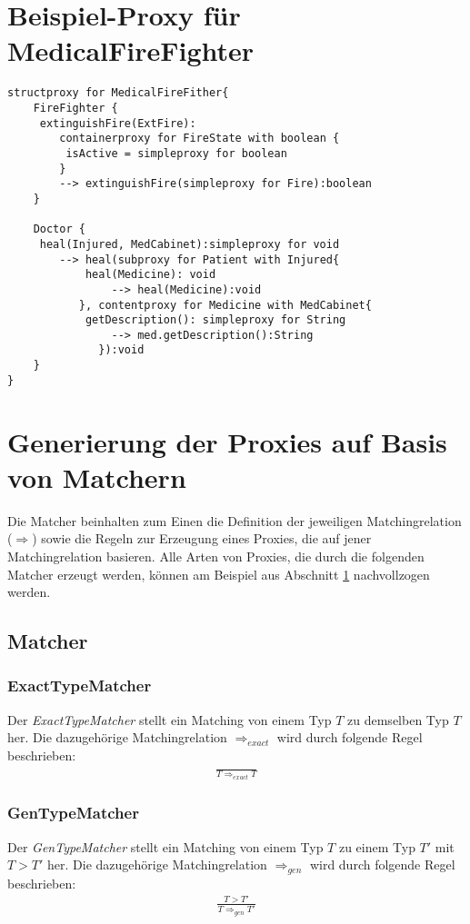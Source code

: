 \documentclass[a4paper,12pt]{article}
\begin{document}
\newpage
\section{Beispiel-Proxy für MedicalFireFighter}\label{xmpl_prxy}
\begin{lstlisting}[caption={Proxy für MedicalFireFighter},captionpos=b,style = dsl]
structproxy for MedicalFireFither{
	FireFighter {
	 extinguishFire(ExtFire): 
	 	containerproxy for FireState with boolean {
		 isActive = simpleproxy for boolean		
		} 
		--> extinguishFire(simpleproxy for Fire):boolean
	}
		
	Doctor {
	 heal(Injured, MedCabinet):simpleproxy for void
		--> heal(subproxy for Patient with Injured{
			heal(Medicine):	void
				--> heal(Medicine):void					
		   }, contentproxy for Medicine with MedCabinet{
			getDescription(): simpleproxy for String
				--> med.getDescription():String			
		      }):void		
	}
}
\end{lstlisting}

\newpage
\section{Generierung der Proxies auf Basis von Matchern}
Die Matcher beinhalten zum Einen die Definition der jeweiligen Matchingrelation ($\Rightarrow$) sowie die Regeln zur Erzeugung eines Proxies, die auf jener Matchingrelation basieren. Alle Arten von Proxies, die durch die folgenden Matcher erzeugt werden, können am Beispiel aus Abschnitt \ref{xmpl_prxy} nachvollzogen werden.
\subsection{Matcher}
\subsubsection{ExactTypeMatcher}\label{sec:exacttypematcher}
Der \emph{ExactTypeMatcher} stellt ein Matching von einem Typ $T$ zu demselben Typ $T$ her. Die dazugehörige Matchingrelation $\Rightarrow_{exact}$ wird durch folgende Regel beschrieben:
\begin{gather*}
\frac{}{T \Rightarrow_{exact} T}
\end{gather*}
\subsubsection{GenTypeMatcher}\label{sec:gentypematcher}
Der \emph{GenTypeMatcher} stellt ein Matching von einem Typ $T$ zu einem Typ $T'$ mit $T > T'$ her. Die dazugehörige Matchingrelation $\Rightarrow_{gen}$ wird durch folgende Regel beschrieben:
\begin{gather*}
\frac{T > T'}{T \Rightarrow_{gen} T'}
\end{gather*}
\end{document}
